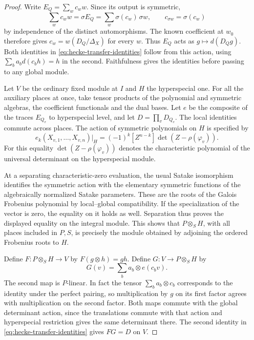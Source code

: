 \begin{proof}
Write \(E_Q=\sum_w c_w w\). Since its output is symmetric,
\[
 \sum_w c_w w=\sigma E_Q=\sum_w\sigma(c_w)\,\sigma w ,
 \qquad c_{\sigma w}=\sigma(c_w)
\]
by independence of the distinct automorphisms. The known coefficient at \(w_0\) therefore gives \(c_w=w(D_Q/\Delta_X)\) for every \(w\). Thus \(E_Q\) acts as \(g\mapsto d(D_Qg)\).
Both identities in \eqref{eq:hecke-transfer-identities}
follow from this action, using \(\sum_b a_b d(c_b h)=h\)
in the second. Faithfulness gives the identities before
passing to any global module.

Let \(V\) be the ordinary fixed module at \(I\) and \(H\)
the hyperspecial one. For all the auxiliary places at once,
take tensor products of the polynomial and symmetric
algebras, the coefficient functionals and the dual bases.
Let \(e\) be the composite of the traces \(E_{Q_v}\)
to hyperspecial level, and let \(D=\prod_v D_{Q_v}\).
The local identities commute across places. The action of
symmetric polynomials on \(H\) is specified by
\[
 e_k(X_{v,1},\ldots,X_{v,n})\big|_H
   =(-1)^k[Z^{n-k}]\det(Z-\rho(\varphi_v)).
\]
For this equality \(\det(Z-\rho(\varphi_v))\) denotes
the characteristic polynomial of the universal
determinant on the hyperspecial module.

At a separating
characteristic-zero evaluation, the usual Satake
isomorphism identifies the symmetric action with the
elementary symmetric functions of the algebraically
normalized Satake parameters. These are the roots of the
Galois Frobenius polynomial by local--global compatibility.
If the specialization of the vector is zero, the equality
on it holds as well. Separation thus proves the displayed
equality on the integral module. This shows that
\(P\otimes_S H\), with all places included in \(P,S\),
is precisely the module obtained by adjoining the ordered
Frobenius roots to \(H\).

Define \(F:P\otimes_S H\to V\) by \(F(g\otimes h)=gh\).
Define \(G:V\to P\otimes_S H\) by
\[
 G(v)=\sum_b a_b\otimes e(c_b v).
\]
The second map is \(P\)-linear. In fact the tensor
\(\sum_b a_b\otimes c_b\) corresponds to the identity
under the perfect pairing, so multiplication by \(g\)
on its first factor agrees with multiplication on the
second factor. Both maps commute with the global
determinant action, since the translations commute with
that action and hyperspecial restriction gives the same
determinant there. The second identity in
\eqref{eq:hecke-transfer-identities} gives \(FG=D\)
on \(V\).


\end{proof}
